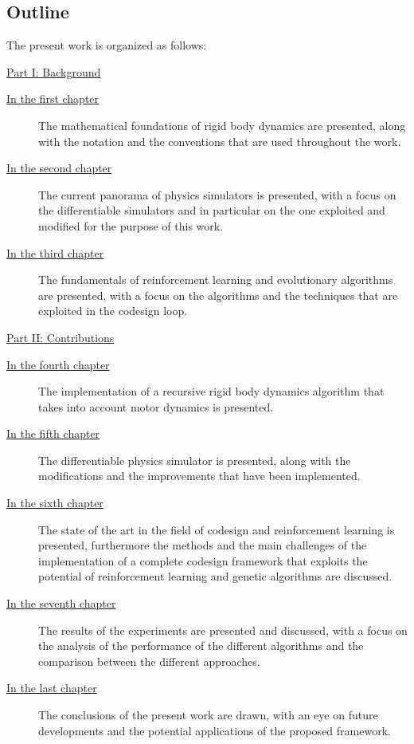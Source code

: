 \subsection*{Outline}

The present work is organized as follows:

\begin{description}

    \item{\hyperref[part:background]{Part I: Background}}

          \begin{description}
              \item[{\hyperref[chp:back_RBDynamics]{In the first chapter}}] The mathematical foundations of rigid body dynamics are presented, along with the notation and the conventions that are used throughout the work.
              \item[{\hyperref[chp:back_PhysicsSimulators]{In the second chapter}}] The current panorama of physics simulators is presented, with a focus on the differentiable simulators and in particular on the one exploited and modified for the purpose of this work.
              \item [{\hyperref[chp:back_RLGA]{In the third chapter}}] The fundamentals of reinforcement learning and evolutionary algorithms are presented, with a focus on the algorithms and the techniques that are exploited in the codesign loop.
          \end{description}

    \item{\hyperref[part:contributions]{Part II: Contributions}}

          \begin{description}
              \item[{\hyperref[chp:contrib_ABA]{In the fourth chapter}}] The implementation of a recursive rigid body dynamics algorithm that takes into account motor dynamics is presented.
              \item[{\hyperref[chp:contrib_JaxSim]{In the fifth chapter}}] The differentiable physics simulator is presented, along with the modifications and the improvements that have been implemented.
              \item[{\hyperref[chp:contrib_CodesignRL]{In the sixth chapter}}] The state of the art in the field of codesign and reinforcement learning is presented, furthermore the methods and the main challenges of the implementation of a complete codesign framework that exploits the potential of reinforcement learning and genetic algorithms are discussed.
              \item[{\hyperref[chp:contrib_ResultsDiscussion]{In the seventh chapter}}] The results of the experiments are presented and discussed, with a focus on the analysis of the performance of the different algorithms and the comparison between the different approaches.
              \item[{\hyperref[chp:contrib_Conclusions]{In the last chapter}}] The conclusions of the present work are drawn, with an eye on future developments and the potential applications of the proposed framework.
          \end{description}
\end{description}